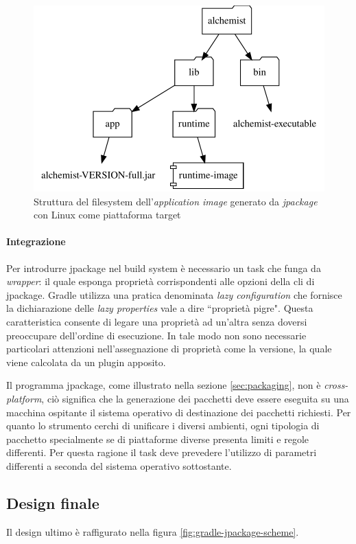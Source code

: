 \begin{figure}
	\centering
	\includegraphics[width=.7\linewidth]{figures/application-image-folder-structure.pdf}
	\caption{Struttura del filesystem dell'\textit{application image} generato da \textit{jpackage} con Linux come piattaforma target}
	\label{fig:application-image-folder-structure}
\end{figure}

\paragraph{Integrazione} Per introdurre jpackage nel build system è necessario un task che funga da \textit{wrapper}: il quale esponga proprietà corrispondenti alle opzioni della \ac{cli} di jpackage. Gradle utilizza una pratica denominata \textit{lazy configuration} che fornisce la dichiarazione delle \textit{lazy properties} vale a dire ``proprietà pigre". Questa caratteristica consente di legare una proprietà ad un'altra senza doversi preoccupare dell'ordine di esecuzione. In tale modo non sono necessarie particolari attenzioni nell'assegnazione di proprietà come la versione, la quale viene calcolata da un plugin apposito. 

Il programma jpackage, come illustrato nella sezione \ref{sec:packaging}, non è \textit{cross-platform}, ciò significa che la generazione dei pacchetti deve essere eseguita su una macchina ospitante il sistema operativo di destinazione dei pacchetti richiesti. Per quanto lo strumento cerchi di unificare i diversi ambienti, ogni tipologia di pacchetto specialmente se di piattaforme diverse presenta limiti e regole differenti. Per questa ragione il task deve prevedere l'utilizzo di parametri differenti a seconda del sistema operativo sottostante.

\subsection{Design finale} Il design ultimo è raffigurato nella figura \ref{fig:gradle-jpackage-scheme}. 

